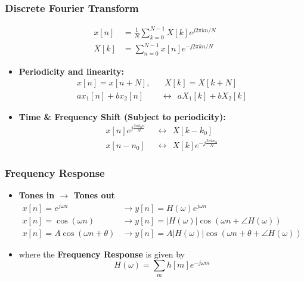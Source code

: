 \documentclass{beamer}
\begin{document}
\begin{frame}
  \frametitle{Discrete Fourier Transform}

  \begin{align*}
    x[n] &= \frac{1}{N}\sum_{k=0}^{N-1} X[k] e^{j2\pi k n/N}\\
    X[k] &= \sum_{n=0}^{N-1} x[n]e^{-j2\pi kn/N}
  \end{align*}
  \begin{itemize}
  \item {\bf Periodicity and linearity:}
    \begin{align*}
      x[n]=x[n+N],&~~~~X[k]=X[k+N]\\
      ax_1[n]+bx_2[n]&~~\leftrightarrow~~aX_1[k]+bX_2[k]
    \end{align*}
  \item {\bf Time \& Frequency Shift (Subject to periodicity):}
    \begin{align*}
      x[n]e^{j\frac{2\pi k_0 n}{N}} ~~&\leftrightarrow~~X[k-k_0]\\
      x[n-n_0] ~~&\leftrightarrow~~X[k]e^{-j\frac{2\pi kn_0}{N}}
    \end{align*}
  \end{itemize}
\end{frame}

\begin{frame}
  \frametitle{Frequency Response}
  \begin{itemize}
  \item {\bf Tones in $\rightarrow$ Tones out}
    \begin{align*}
      x[n]=e^{j\omega n} &\rightarrow y[n]=H(\omega)e^{j\omega n}\\
      x[n]=\cos\left(\omega n\right)
      &\rightarrow y[n]=|H(\omega)|\cos\left(\omega n+\angle H(\omega)\right)\\
      x[n]=A\cos\left(\omega n+\theta\right)
      &\rightarrow y[n]=A|H(\omega)|\cos\left(\omega n+\theta+\angle H(\omega)\right)
    \end{align*}
  \item where the {\bf Frequency Response} is given by
    \[
    H(\omega) = \sum_m h[m]e^{-j\omega m}
    \]
  \end{itemize}
\end{frame}  
        
\end{document}
